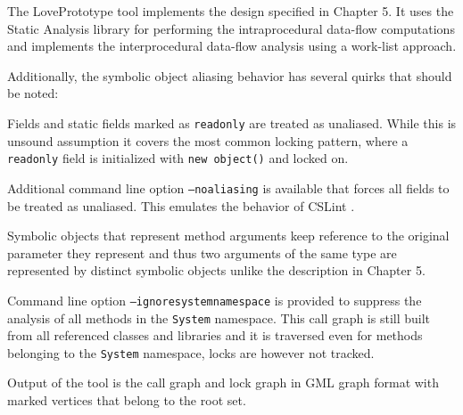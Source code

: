 The LovePrototype tool implements the design specified in Chapter 5. It uses the Static Analysis library for performing the intraprocedural data-flow computations and implements the interprocedural data-flow analysis using a work-list approach.

Additionally, the symbolic object aliasing behavior has several quirks that should be noted:
\begin{itemize*}
\item Fields and static fields marked as \texttt{readonly} are treated as unaliased. While this is unsound assumption it covers the most common locking pattern, where a \texttt{readonly} field is initialized with \texttt{new object()} and locked on.
\item Additional command line option \texttt{--noaliasing} is available that forces all fields to be treated as unaliased. This emulates the behavior of CSLint \citep{CSLint}.
\item Symbolic objects that represent method arguments keep reference to the original parameter they represent and thus two arguments of the same type are represented by distinct symbolic objects unlike the description in Chapter 5.
\end{itemize*} 

Command line option \texttt{--ignoresystemnamespace} is provided to suppress the analysis of all methods in the \texttt{System} namespace. This call graph is still built from all referenced classes and libraries and it is traversed even for methods belonging to the \texttt{System} namespace, locks are however not tracked.

Output of the tool is the call graph and lock graph in GML graph format with marked vertices that belong to the root set.

